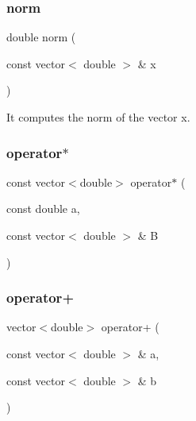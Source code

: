 \subsubsection{\texorpdfstring{norm}{norm}}
{\footnotesize\ttfamily double norm (\begin{DoxyParamCaption}\item[{const vector$<$ double $>$ \&}]{x }\end{DoxyParamCaption})\hspace{0.3cm}{\ttfamily [friend]}}



It computes the norm of the vector x. 

\mbox{\label{class_function_a5c042028e918038808f0b9255d846bdc}} 
\subsubsection{\texorpdfstring{operator$\ast$}{operator*}}
{\footnotesize\ttfamily const vector$<$double$>$ operator$\ast$ (\begin{DoxyParamCaption}\item[{const double}]{a,  }\item[{const vector$<$ double $>$ \&}]{B }\end{DoxyParamCaption})\hspace{0.3cm}{\ttfamily [friend]}}

\mbox{\label{class_function_af7fb1be44ca3ade61cec8d396d0a3ca1}} 
\subsubsection{\texorpdfstring{operator+}{operator+}}
{\footnotesize\ttfamily vector$<$double$>$ operator+ (\begin{DoxyParamCaption}\item[{const vector$<$ double $>$ \&}]{a,  }\item[{const vector$<$ double $>$ \&}]{b }\end{DoxyParamCaption})\hspace{0.3cm}{\ttfamily [friend]}}

\mbox{\label{class_function_a5bba89b945d56abb9cf2dd756cf71fb8}} 
